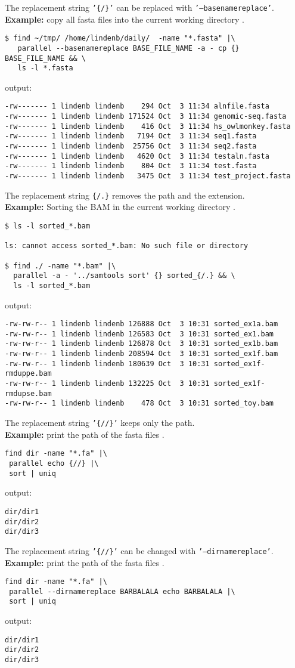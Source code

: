 \documentclass{article}
\newcommand{\example}[1]{
\textbf{Example: } {\color[rgb]{0,0,1} #1 } .
}
\begin{document}
The replacement string \texttt{'\{/\}'} can be replaced with \texttt{'--basenamereplace'}.\\
\example{copy all fasta files into the current working directory}
\begin{lstlisting}
$ find ~/tmp/ /home/lindenb/daily/  -name "*.fasta" |\
   parallel --basenamereplace BASE_FILE_NAME -a - cp {}  BASE_FILE_NAME && \
   ls -l *.fasta
\end{lstlisting}
output:
\begin{lstlisting}
-rw------- 1 lindenb lindenb    294 Oct  3 11:34 alnfile.fasta
-rw------- 1 lindenb lindenb 171524 Oct  3 11:34 genomic-seq.fasta
-rw------- 1 lindenb lindenb    416 Oct  3 11:34 hs_owlmonkey.fasta
-rw------- 1 lindenb lindenb   7194 Oct  3 11:34 seq1.fasta
-rw------- 1 lindenb lindenb  25756 Oct  3 11:34 seq2.fasta
-rw------- 1 lindenb lindenb   4620 Oct  3 11:34 testaln.fasta
-rw------- 1 lindenb lindenb    804 Oct  3 11:34 test.fasta
-rw------- 1 lindenb lindenb   3475 Oct  3 11:34 test_project.fasta
\end{lstlisting}


The replacement string  \texttt{\{/.\}} removes the path and the extension.\\
\example{Sorting the BAM in the current working directory}
\begin{lstlisting}
$ ls -l sorted_*.bam

ls: cannot access sorted_*.bam: No such file or directory

$ find ./ -name "*.bam" |\
  parallel -a - '../samtools sort' {} sorted_{/.} && \
  ls -l sorted_*.bam
\end{lstlisting}
output:
\begin{lstlisting}
-rw-rw-r-- 1 lindenb lindenb 126888 Oct  3 10:31 sorted_ex1a.bam
-rw-rw-r-- 1 lindenb lindenb 126583 Oct  3 10:31 sorted_ex1.bam
-rw-rw-r-- 1 lindenb lindenb 126878 Oct  3 10:31 sorted_ex1b.bam
-rw-rw-r-- 1 lindenb lindenb 208594 Oct  3 10:31 sorted_ex1f.bam
-rw-rw-r-- 1 lindenb lindenb 180639 Oct  3 10:31 sorted_ex1f-rmduppe.bam
-rw-rw-r-- 1 lindenb lindenb 132225 Oct  3 10:31 sorted_ex1f-rmdupse.bam
-rw-rw-r-- 1 lindenb lindenb    478 Oct  3 10:31 sorted_toy.bam
\end{lstlisting}


The replacement string \texttt{'\{//\}'} keeps only the path.\\
\example{print the path of the fasta files}
\begin{lstlisting}
find dir -name "*.fa" |\
 parallel echo {//} |\
 sort | uniq
\end{lstlisting}
output:
\begin{lstlisting}
dir/dir1
dir/dir2
dir/dir3
\end{lstlisting}
The replacement string \texttt{'\{//\}'} can be changed with  \texttt{'--dirnamereplace'}.\\
\example{print the path of the fasta files}
\begin{lstlisting}
find dir -name "*.fa" |\
 parallel --dirnamereplace BARBALALA echo BARBALALA |\
 sort | uniq
\end{lstlisting}
output:
\begin{lstlisting}
dir/dir1
dir/dir2
dir/dir3
\end{lstlisting}
\end{document}
